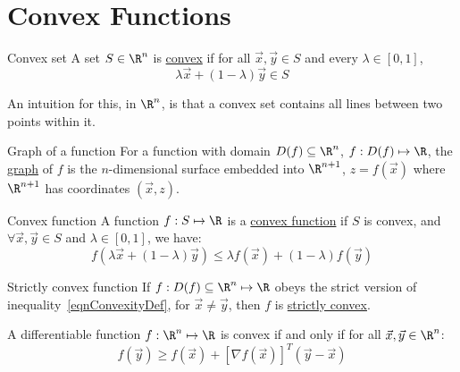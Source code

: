 \documentclass[../Main.tex]{subfiles}
\begin{document}
\section{Convex Functions}
\begin{definition}{Convex set}
    A set $S \in \R^n$ is \underline{convex} if for all $\vec{x}, \vec{y} \in S$ and every $\lambda \in [0, 1]$,
    \begin{equation*}
        \lambda \vec{x} + (1 - \lambda) \vec{y} \in S
    \end{equation*}
\end{definition}
\begin{remark}
    An intuition for this, in $\R^n$, is that a convex set contains all lines between two points within it.
\end{remark}
\begin{definition}{Graph of a function}
    For a function with domain $D(f) \subseteq \R^n$, $f : D(f) \mapsto \R$, the \underline{graph} of $f$ is the $n$-dimensional surface embedded into $\R^{n+1}$, $z = f(\vec{x})$ where $\R^{n+1}$ has coordinates $(\vec{x}, z)$.
\end{definition}
\begin{definition}{Convex function}
    A function $f : S \mapsto \R$ is a \underline{convex function} if $S$ is convex, and $\forall \vec{x}, \vec{y} \in S$ and $\lambda \in [0, 1]$, we have:
    \begin{equation}
        f(\lambda \vec{x} + (1-\lambda)\vec{y}) \leq \lambda f(\vec{x}) + (1 - \lambda) f(\vec{y})
        \label{eqnConvexityDef}
    \end{equation}
\end{definition}
\begin{definition}{Strictly convex function}
    If $f : D(f) \subseteq \R^n \mapsto \R$ obeys the strict version of inequality~\ref{eqnConvexityDef}, for $\vec{x} \neq \vec{y}$, then $f$ is \underline{strictly convex}.
\end{definition}
\begin{theorem}
    A differentiable function $f : \R^n \mapsto \R$ is convex if and only if for all $\vec{x}, \vec{y} \in \R^n$:
    \begin{equation}
        f(\vec{y}) \geq f(\vec{x}) + \left[\nabla f(\vec{x})\right]^T(\vec{y} - \vec{x})
        \label{eqnFirstOrderCondition}
    \end{equation}
    \label{thmFirstOrderCondition}
\end{theorem}
\end{document}
